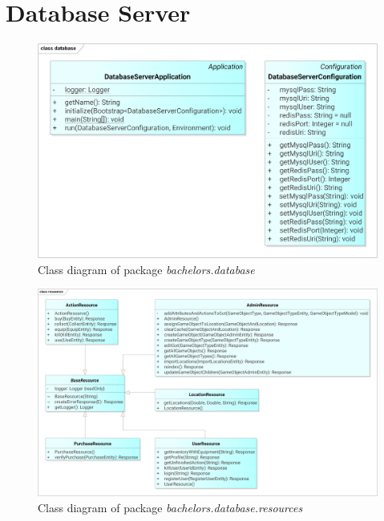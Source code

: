\section{Database Server}
\begin{figure}[h]	
	\includegraphics[width=\textwidth]{figures/classdiagrams/dsdatabase}
	\centering			
	\caption{Class diagram of package \textit{bachelors.database}}
\end{figure}

\begin{figure}[h]	
	\includegraphics[width=\textwidth]{figures/classdiagrams/dsresources}
	\centering			
	\caption{Class diagram of package \textit{bachelors.database.resources}}
\end{figure}

